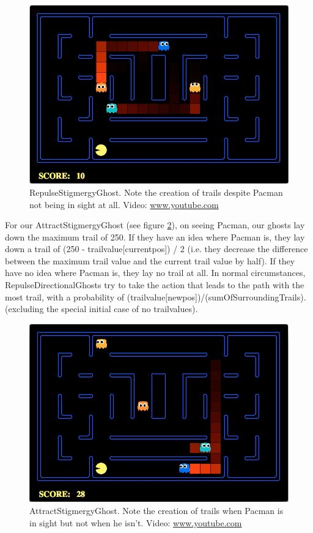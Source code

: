 \documentclass[11pt]{article}
\begin{document}
\begin{multicols}{2}
\begin{figure}[H]
	\includegraphics[width=\columnwidth]{RepulseGhost.png}
	\caption{RepulseStigmergyGhost. Note the creation of trails despite Pacman not being in sight at all.
	Video: \protect\url{www.youtube.com} }
	\label{fig:repulseghost}
\end{figure}

For our AttractStigmergyGhost (see figure \ref{fig:attractghost}), on seeing Pacman, our ghosts lay down the maximum trail of 250.  If they have an idea where Pacman is, they lay down a trail of (250 - trailvalue[currentpos]) / 2 (i.e. they decrease the difference between the maximum trail value and the current trail value by half).   If they have no idea where Pacman is, they lay no trail at all. In normal circumstances, RepulseDirectionalGhosts try to take the action that leads to the path with the most trail, with a probability of (trailvalue[newpos])/(sumOfSurroundingTrails). (excluding the special initial case of no trailvalues).  

\begin{figure}[H]
	\includegraphics[width=\columnwidth]{AttractGhost.png}
	\caption{AttractStigmergyGhost. Note the creation of trails when Pacman is in sight but not when he isn't.
	Video: \protect\url{www.youtube.com} }
	\label{fig:attractghost}
\end{figure}


\end{multicols}
\end{document}
